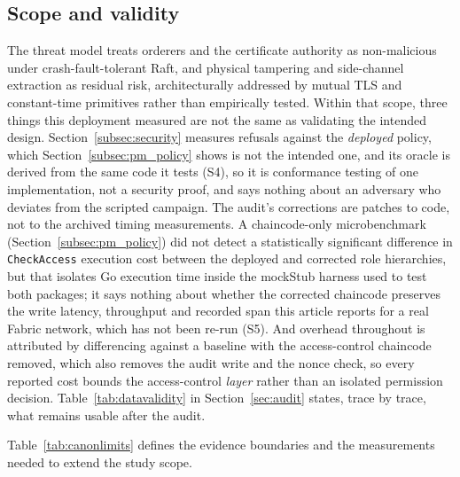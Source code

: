 \documentclass[a4paper,fleqn]{cas-dc}
\begin{document}
\subsection{Scope and validity}
\label{subsec:notvalidated}
\label{subsec:limits}
\label{subsec:threats}

The threat model treats orderers and the certificate authority as
non-malicious under crash-fault-tolerant Raft, and physical tampering and
side-channel extraction as residual risk, architecturally addressed by
mutual TLS and constant-time primitives rather than empirically tested.
Within that scope, three things this deployment measured are not the same
as validating the intended design. Section~\ref{subsec:security} measures
refusals against the \emph{deployed} policy, which
Section~\ref{subsec:pm_policy} shows is not the intended one, and its
oracle is derived from the same code it tests (S4), so it is conformance
testing of one implementation, not a security proof, and says nothing
about an adversary who deviates from the scripted campaign. The
audit's corrections are patches to code, not to the archived timing
measurements. A chaincode-only microbenchmark (Section~\ref{subsec:pm_policy})
did not detect a statistically significant difference in \texttt{CheckAccess} execution cost between the deployed and corrected role hierarchies, but that isolates Go
execution time inside the mockStub harness used to test both packages; it
says nothing about whether the corrected chaincode preserves the write
latency, throughput and recorded span this article reports for a real
Fabric network, which has not been re-run (S5). And overhead throughout is
attributed by differencing against a
baseline with the access-control chaincode removed, which also removes the
audit write and the nonce check, so every reported cost bounds the
access-control \emph{layer} rather than an isolated permission decision.
Table~\ref{tab:datavalidity} in Section~\ref{sec:audit} states, trace
by trace, what remains usable after the audit.

Table~\ref{tab:canonlimits} defines the evidence boundaries and the
measurements needed to extend the study scope.
\end{document}
